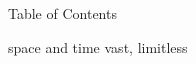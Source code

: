 


\vspace{\myLineheight}\begin{multicols}{2}\raggedcolumns{}



\end{multicols}


{\mktsHTwo{}Table of Contents\mktsHTwoBeg}%


\vspace{\myLineheight}\begin{multicols}{2}\raggedcolumns{}{\mktsToc%
\mktsTocBeg}%


\end{multicols}


{\mktsHTwo{}\cjkgGlue{} space and time vast, limitless\mktsHTwoBeg}%


\vspace{\myLineheight}\begin{multicols}{2}\raggedcolumns{}\end{multicols}


